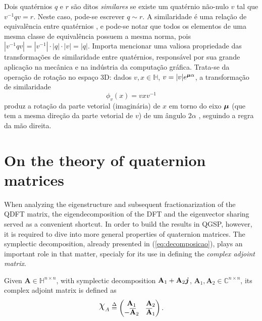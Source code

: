 Dois quat\'ernios $ q $ e $ r $ s\~ao ditos \emph{similares} se existe um quat\'ernio n\~ao-nulo $ v $ tal que $ v^{-1}q v = r $. Neste caso, pode-se escrever $ q \sim r $. A similaridade \'e uma rela\c c\~ao de equival\^encia entre quat\'ernios \cite{zhang1997quaternions}, e pode-se notar que todos os elementos de uma mesma classe de equival\^encia possuem a mesma norma, pois $ |v^{-1}q v| = |v^{-1}| \cdot |q| \cdot |v| = |q| $. Importa mencionar uma valiosa propriedade das transforma\c c\~oes de similaridade entre quat\'ernios, respons\'avel por sua grande aplica\c c\~ao na mec\^anica e na ind\'ustria da computa\c c\~ao gr\'afica. Trata-se da opera\c c\~ao de rota\c c\~ao no espa\c co 3D: dados $ v,x \in \mathbb{H} $, $ v = |v| e^{\boldsymbol{\mu} \alpha}$, a transforma\c c\~ao de similaridade
\begin{equation}
\label{eq:rotacao}
\phi_v(x) = v x v^{-1}
\end{equation}
produz a rota\c c\~ao da parte vetorial (imagin\'aria) de $ x $ em torno do eixo $ \boldsymbol{\mu} $ (que tem a mesma dire\c c\~ao da parte vetorial de $ v $) de um \^angulo $ 2\alpha $ \cite{ward2012quaternions}, seguindo a regra da m\~ao direita.


\section{On the theory of quaternion matrices}

When analyzing the eigenstructure and subsequent fractionarization of the QDFT matrix, the eigendecomposition of the DFT and the eigenvector sharing served as a convenient shortcut. In order to build the results in QGSP, however, it is required to dive into more general properties of quaternion matrices. The symplectic decomposition, already presented in (\ref{eq:decomposicao}), plays an important role in that matter, specialy for its use in defining the \textit{complex adjoint matrix}.

\begin{definition}
\label{def:complexadjoint}
Given $ \mathbf{A} \in \mathbb{H}^{n \times n} $, with symplectic decomposition $ \mathbf{A}_1 + \mathbf{A}_2 \boldsymbol{j}$, $ \mathbf{A}_1,\mathbf{A}_2 \in \mathbb{C}^{n \times n} $, its complex adjoint matrix is defined as
\begin{equation}
\rchi_{A} \overset{\Delta}{=}
\begin{pmatrix}
\mathbf{A}_1 & \mathbf{A}_2\\ 
- \overline{\mathbf{A}}_2 & \overline{\mathbf{A}}_1
\end{pmatrix}.
\end{equation}
\end{definition}

